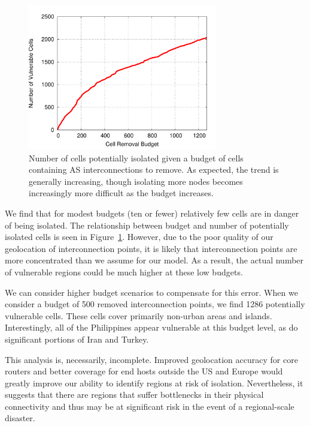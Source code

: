     \begin{figure}[tb]
\centering
\includegraphics[width=3.25in]{isolation}
\caption[]{\label{fig:isolation} Number of cells potentially isolated given a budget of cells containing AS interconnections to remove. As expected, the trend is generally increasing, though isolating more nodes becomes increasingly more difficult as the budget increases.} 
\end{figure}

    We find that for modest budgets (ten or fewer) relatively few cells are in danger of being isolated.
    The relationship between budget and number of potentially isolated cells is seen in Figure~\ref{fig:isolation}. 
    However, due to the poor quality of our geolocation of interconnection points, it is likely that interconnection points are more concentrated than we assume for our model.
    As a result, the actual number of vulnerable regions could be much higher at these low budgets.

    We can consider higher budget scenarios to compensate for this error. 
    When we consider a budget of 500 removed interconnection points, we find 1286 potentially vulnerable cells. 
    These cells cover primarily non-urban areas and islands.
    Interestingly, all of the Philippines appear vulnerable at this budget level, as do significant portions of Iran and Turkey. 

    This analysis is, necessarily, incomplete.
    Improved geolocation accuracy for core routers and better coverage for end hosts outside the US and Europe would greatly improve our ability to identify regions at risk of isolation. 
    Nevertheless, it suggests that there are regions that suffer bottlenecks in their physical connectivity and thus may be at significant risk in the event of a regional-scale disaster. 
